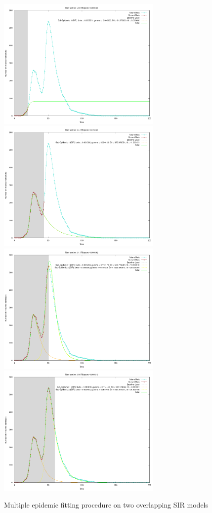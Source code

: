 \begin{centering}
\begin{figure}[h!]
  \includegraphics[width=8cm]{images/multi/sirsir1.png}
  \includegraphics[width=8cm]{images/multi/sirsir2.png}
  \includegraphics[width=8cm]{images/multi/sirsir3.png}
  \includegraphics[width=8cm]{images/multi/sirsir4.png}
  \caption{Multiple epidemic fitting procedure on two overlapping SIR models}
\label{fig:sirsir1}
  \end{figure}
\end{centering}

